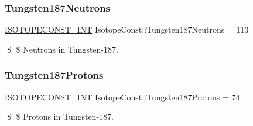 \subsubsection{\texorpdfstring{Tungsten187\+Neutrons}{Tungsten187Neutrons}}
{\footnotesize\ttfamily \mbox{\hyperlink{group___isotope_const-_macros_ga5f18360b3e99483a35c32d789e62621c}{I\+S\+O\+T\+O\+P\+E\+C\+O\+N\+S\+T\+\_\+\+I\+NT}} Isotope\+Const\+::\+Tungsten187\+Neutrons = 113}

\$ \$ Neutrons in Tungsten-\/187. \mbox{\label{group___isotope_const-_tungsten-_w187_ga2e05c50189166ddaf0b5649d0f334067}} 
\subsubsection{\texorpdfstring{Tungsten187\+Protons}{Tungsten187Protons}}
{\footnotesize\ttfamily \mbox{\hyperlink{group___isotope_const-_macros_ga5f18360b3e99483a35c32d789e62621c}{I\+S\+O\+T\+O\+P\+E\+C\+O\+N\+S\+T\+\_\+\+I\+NT}} Isotope\+Const\+::\+Tungsten187\+Protons = 74}

\$ \$ Protons in Tungsten-\/187. 